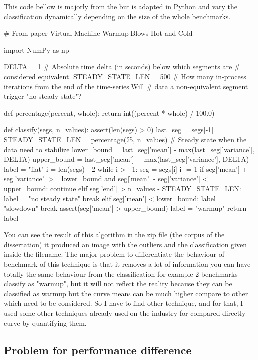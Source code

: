 \documentclass{article}
\begin{document}
This code bellow is majorly from the \cite{barrett2017virtual} but is adapted in Python and vary the classification dynamically depending on the size of the whole benchmarks.
\begin{python}[h!]

# From paper Virtual Machine Warmup Blows Hot and Cold

import NumPy as np


DELTA = 1  # Absolute time delta (in seconds) below which segments are
# considered equivalent.
STEADY_STATE_LEN = 500  # How many in-process iterations from the end of the time-series
Will # data a non-equivalent segment trigger "no steady state"?


def percentage(percent, whole):
    return int((percent * whole) / 100.0)


def classify(segs, n_values):
    assert(len(segs) > 0)
    last_seg = segs[-1]
    STEADY_STATE_LEN = percentage(25, n_values) # Steady state when the data need to stabilize
    lower_bound = last_seg['mean'] - max(last_seg['variance'], DELTA)
    upper_bound = last_seg['mean'] + max(last_seg['variance'], DELTA)
    label = "flat"
    i = len(segs) - 2
    while i > - 1:
        seg = segs[i]
        i -= 1
        if seg['mean'] + seg['variance'] >= lower_bound and seg['mean'] - seg['variance'] <= upper_bound:
            continue
        elif seg['end'] > n_values - STEADY_STATE_LEN:
            label = "no steady state"
            break
        elif seg['mean'] < lower_bound:
            label = "slowdown"
            break
        assert(seg['mean'] > upper_bound)
        label = "warmup"
    return label
\end{python}

You can see the result of this algorithm in the zip file (the corpus of the dissertation) it produced an image with the outliers and the classification given inside the filename.
The major problem to differentiate the behaviour of benchmark of this technique is that it removes a lot of information you can have totally the same behaviour from the classification for example 2 benchmarks classify as "warmup", but it will not reflect the reality because they can be classified as warmup but the curve means can be much higher compare to other which need to be considered. So I have to find other technique, and for that, I used some other techniques already used on the industry for compared directly curve by quantifying them.



\subsection{Problem for performance difference}
\end{document}
